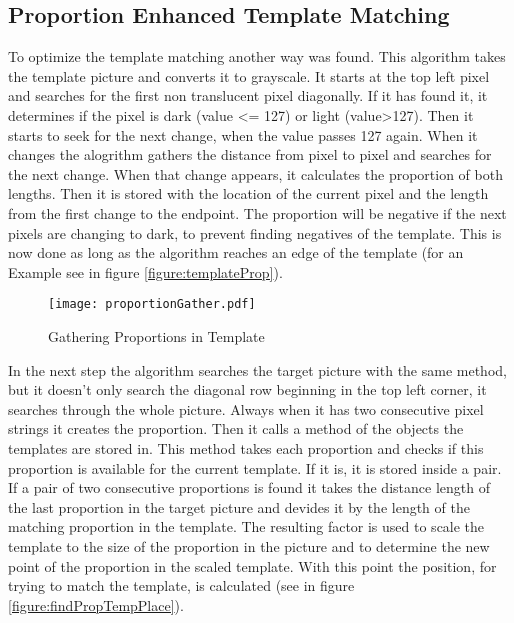 \subsection{Proportion Enhanced Template Matching}
To optimize the template matching another way was found. This algorithm
takes the template picture and converts it to grayscale. It starts at the top left pixel
and searches for the first non translucent pixel diagonally. If it has found it,
it determines if the pixel is dark (value <= 127) or light (value>127). Then it
starts to seek for the next change, when the value passes 127 again.
When it changes the alogrithm gathers the distance from pixel to pixel and searches for the next change.
When that change appears, it calculates the proportion of both lengths.
Then it is stored with the location of the current pixel and the
length from the first change to the endpoint. 
The proportion will be negative if the next pixels are changing to dark,
to prevent finding negatives of the template. 
This is now done as long as the algorithm reaches an edge of the template 
(for an Example see in figure \vref{figure:templateProp}).

\begin{figure}[H]
\begin{center}
  \texttt{[image: proportionGather.pdf]}
  \caption{Gathering Proportions in Template}
  \label{figure:templateProp}
\end{center}
\end{figure}

In the next step the algorithm searches the target picture with the same method, but
it doesn't only search the diagonal row beginning in the top left corner, it searches
through the whole picture. Always when it has two consecutive pixel strings it
creates the proportion. Then it calls a method of the objects the templates are stored in.
This method takes each proportion and checks if this proportion is available for
the current template. If it is, it is stored inside a pair. If a pair of two
consecutive proportions is found it takes the distance length of the last
proportion in the target picture and devides it by the length of the matching proportion
in the template. The resulting factor is used to scale the template to the size of the
proportion in the picture and to determine the new point of the proportion in the scaled template.
With this point the position, for trying to match the template, is calculated 
(see in figure \vref{figure:findPropTempPlace}).

